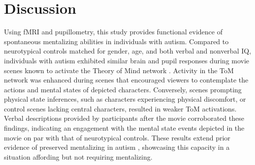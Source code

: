 



\section*{Discussion}
Using fMRI and pupillometry, this study provides functional evidence of spontaneous mentalizing abilities in individuals with autism. Compared to neurotypical controls matched for gender, age, and both verbal and nonverbal IQ, individuals with autism exhibited similar brain and pupil responses during movie scenes known to activate the Theory of Mind network \citep{jacoby2016,richardson2018}. Activity in the ToM network was enhanced during scenes that encouraged viewers to contemplate the actions and mental states of depicted characters. Conversely, scenes prompting physical state inferences, such as characters experiencing physical discomfort, or control scenes lacking central characters, resulted in weaker ToM activations. Verbal descriptions provided by participants after the movie corroborated these findings, indicating an engagement with the mental state events depicted in the movie on par with that of neurotypical controls. These results extend prior evidence of preserved mentalizing in autism \citep{moessnang2020,dufour2013}, showcasing this capacity in a situation affording but not requiring mentalizing.


